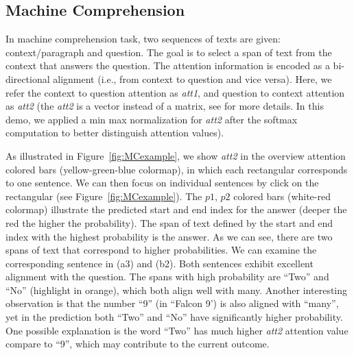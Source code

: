 \subsection{Machine Comprehension}
\label{sec:MCexample}
In machine comprehension task, two sequences of texts are given: context/paragraph and question.
The goal is to select a span of text from the context that answers the question. 
The attention information is encoded as a bi-directional alignment (i.e., from context to question and vice versa). 
Here, we refer the context to question attention as \emph{att1}, and question to context attention as \emph{att2} (the \emph{att2} is a vector instead of a matrix, see \cite{Seo2016} for more details. In this demo, we applied a min max normalization for \emph{att2} after the softmax computation to better distinguish attention values).

As illustrated in Figure~\ref{fig:MCexample}, we show \emph{att2} in the overview attention colored bars (yellow-green-blue colormap), in which each rectangular corresponds to one sentence. We can then focus on individual sentences by click on the rectangular (see Figure~\ref{fig:MCexample}).
The $p1$, $p2$ colored bars (white-red colormap) illustrate the predicted start and end index for the answer (deeper the red the higher the probability). The span of text defined by the start and end index with the highest probability is the answer.
%
As we can see, there are two spans of text that correspond to higher probabilities. We can examine the corresponding sentence in (a3) and (b2). Both sentences exhibit excellent alignment with the question. The spans with high probability are ``Two'' and ``No'' (highlight in orange), which both align well with many.
Another interesting observation is that the number ``9'' (in ``Falcon 9') is also aligned with ``many'', yet in the prediction both ``Two'' and ``No'' have significantly higher probability.
One possible explanation is the word ``Two'' has much higher \emph{att2} attention value compare to ``9'', which may contribute to the current outcome.
